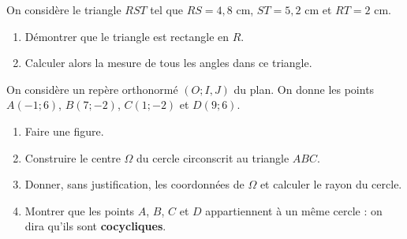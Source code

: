 \documentclass[11pt]{article}
\begin{document}

\begin{exo}
On considère le triangle $RST$ tel que $RS=4,8$ cm,
$ST=5,2$ cm et $RT=2$ cm.
\begin{enumerate}
  \item Démontrer que le triangle est rectangle en $R$.
  \item Calculer alors la mesure de tous les angles dans ce triangle.
\end{enumerate}
\end{exo}

\begin{exo}
On considère un repère orthonormé $(O; I, J)$ du plan.
On donne les points $A(-1; 6)$, $B(7; -2)$, $C(1; -2)$ et $D(9; 6)$.
\begin{enumerate}
  \item Faire une figure.
  \item Construire le centre $\Omega$ du cercle circonscrit au triangle $ABC$.
  \item Donner, sans justification, les coordonnées de $\Omega$ et calculer le
    rayon du cercle.
  \item Montrer que les points $A$, $B$, $C$ et $D$ appartiennent à un même
    cercle : on dira qu'ils sont \textbf{cocycliques}.
\end{enumerate}
\end{exo}
\end{document}
